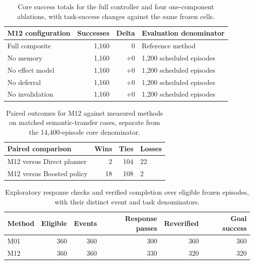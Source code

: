 \begin{table}[H]\centering\small
\begin{tabularx}{.96\linewidth}{lrrX}\toprule
M12 configuration & Successes & Delta & Evaluation denominator\\\midrule
Full composite & 1,160 & 0 & Reference method\\
No memory & 1,160 & +0 & 1,200 scheduled episodes\\
No effect model & 1,160 & +0 & 1,200 scheduled episodes\\
No deferral & 1,160 & +0 & 1,200 scheduled episodes\\
No invalidation & 1,160 & +0 & 1,200 scheduled episodes\\\bottomrule
\end{tabularx}\caption{Core success totals for the full controller and four one-component ablations, with task-success changes against the same frozen cells.}\label{tab:ablation-results}\end{table}

\begin{table}[H]\centering\small
\begin{tabularx}{.96\linewidth}{lrrX}\toprule
Paired comparison & Wins & Ties & Losses\\\midrule
M12 versus Direct planner & 2 & 104 & 22\\
M12 versus Boosted policy & 18 & 108 & 2\\\bottomrule
\end{tabularx}\caption{Paired outcomes for M12 against measured methods on matched semantic-transfer cases, separate from the 14,400-episode core denominator.}\label{tab:semantic-pairs}\end{table}

\begin{table}[H]\centering\small
\begin{tabularx}{.96\linewidth}{lrrrrr}\toprule
Method & Eligible & Events & Response passes & Reverified & Goal success\\\midrule
M01 & 360 & 360 & 300 & 360 & 360\\
M12 & 360 & 360 & 330 & 320 & 320\\\bottomrule
\end{tabularx}\caption{Exploratory response checks and verified completion over eligible frozen episodes, with their distinct event and task denominators.}\label{tab:event-response-counts}\end{table}
